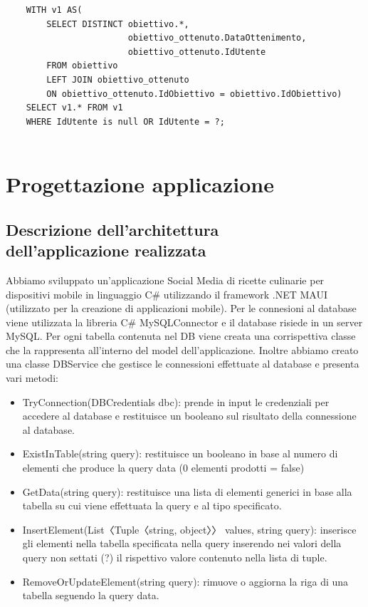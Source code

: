 ﻿\documentclass[a4paper,12pt]{report}
\begin{document}
\begin{verbatim}
    WITH v1 AS(
        SELECT DISTINCT obiettivo.*,
                        obiettivo_ottenuto.DataOttenimento,
                        obiettivo_ottenuto.IdUtente
        FROM obiettivo
        LEFT JOIN obiettivo_ottenuto
        ON obiettivo_ottenuto.IdObiettivo = obiettivo.IdObiettivo)
    SELECT v1.* FROM v1
    WHERE IdUtente is null OR IdUtente = ?;
    
    \end{verbatim}

\chapter{Progettazione applicazione}
\section{Descrizione dell'architettura\\ dell'applicazione realizzata}
Abbiamo sviluppato un'applicazione Social Media di ricette culinarie per dispositivi mobile in linguaggio C\# utilizzando il framework .NET MAUI (utilizzato per la creazione di applicazioni mobile).
Per le connesioni al database viene utilizzata la libreria C\# MySQLConnector e il database risiede in un server MySQL.
Per ogni tabella contenuta nel DB viene creata una corrispettiva classe che la rappresenta all'interno del
model dell'applicazione. Inoltre abbiamo creato una classe DBService che gestisce le connessioni effettuate al database e presenta vari metodi:
\begin{itemize}
    \item TryConnection(DBCredentials dbc): prende in input le credenziali per accedere al database e restituisce un booleano sul risultato della connessione al database.
    \item ExistInTable(string query): restituisce un booleano in base al numero di elementi che produce la query data (0 elementi prodotti = false)
    \item GetData(string query): restituisce una lista di elementi generici in base alla tabella su cui viene effettuata la query e al tipo specificato.
    \item InsertElement(List〈Tuple〈string, object〉〉 values, string query): inserisce gli elementi nella tabella specificata nella query inserendo nei valori della query non settati (?) il rispettivo valore contenuto nella lista di tuple.
    \item RemoveOrUpdateElement(string query): rimuove o aggiorna la riga di una tabella seguendo la query data.
\end{itemize}
\end{document}
